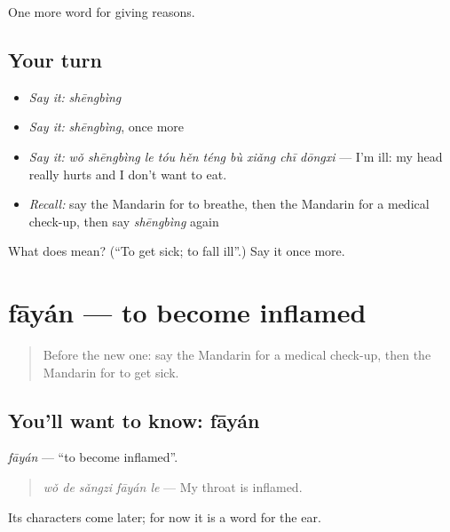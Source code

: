 \begin{grammarlens}[title={What you've built}]
One more word for giving reasons.
\end{grammarlens}

\subsection*{Your turn}
\begin{itemize}
\raggedright
  \item \emph{Say it:} \emph{shēngbìng}
  \item \emph{Say it:} \emph{shēngbìng}, once more
  \item \emph{Say it:} \emph{wǒ shēngbìng le tóu hěn téng bù xiǎng chī dōngxi} — I'm ill: my head really hurts and I don't want to eat.
  \item \emph{Recall:} say the Mandarin for to breathe, then the Mandarin for a medical check-up, then say \emph{shēngbìng} again
\end{itemize}

\begin{tcolorbox}[breakable,colback=teal!4,colframe=teal!35!black,title={Before you move on}]
What does  mean? (\textquotedblleft{}To get sick; to fall ill\textquotedblright{}.) Say it once more.
\end{tcolorbox}
\section[fāyán]{fāyán — to become inflamed}

\label{lesson:ZH-C240-fayan}



\begin{quote}
Before the new one: say the Mandarin for a medical check-up, then the Mandarin for to get sick.
\end{quote}

\subsection*{You'll want to know: fāyán}
\emph{fāyán} — \textquotedblleft{}to become inflamed\textquotedblright{}.

\begin{quote}
\emph{wǒ de sǎngzi fāyán le} — My throat is inflamed.
\end{quote}

Its characters come later; for now it is a word for the ear.

